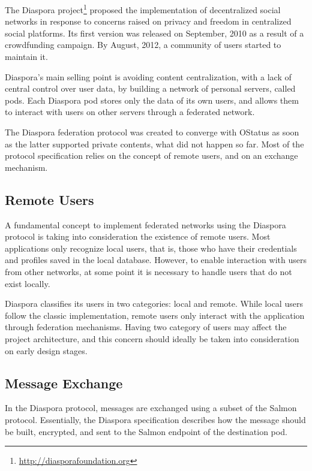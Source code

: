 The Diaspora project\footnote{\url{http://diasporafoundation.org}} proposed the
implementation of decentralized social networks in response to concerns raised
on privacy and freedom in centralized social platforms. Its first version was
released on September, 2010 as a result of a crowdfunding campaign. By August,
2012, a community of users started to maintain it.

Diaspora's main selling point is avoiding content centralization, with a lack of
central control over user data, by building a network of personal servers,
called pods. Each Diaspora pod stores only the data of its own users, and
allows them to interact with users on other servers through a federated
network.

The Diaspora federation protocol was created to converge with OStatus as
soon as the latter supported private contents, what did not happen so
far. Most of the protocol specification relies on the concept of remote
users, and on an exchange mechanism.

\subsection{Remote Users}

A fundamental concept to implement federated networks using the Diaspora
protocol is taking into consideration the existence of remote users.
Most applications only recognize local users, that is, those who have
their credentials and profiles saved in the local database. However, to
enable interaction with users from other networks, at some point it is
necessary to handle users that do not exist locally.

Diaspora classifies its users in two categories: local and remote. While
local users follow the classic implementation, remote users only
interact with the application through federation mechanisms. Having two
category of users may affect the project architecture, and this concern
should ideally be taken into consideration on early design stages.

\subsection{Message Exchange}

In the Diaspora protocol, messages are exchanged using a subset of the
Salmon protocol. Essentially, the Diaspora specification describes how
the message should be built, encrypted, and sent to the Salmon endpoint
of the destination pod.

